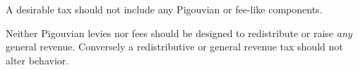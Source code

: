 




\begin{desideratum}
	A desirable tax should not include any Pigouvian or fee-like components.
	\label{des:ordoliberal-hygiene}
\end{desideratum}


Neither Pigouvian levies nor fees should be designed to redistribute or raise \emph{any} general revenue.
%
Conversely a redistributive or general revenue tax should not alter behavior.

